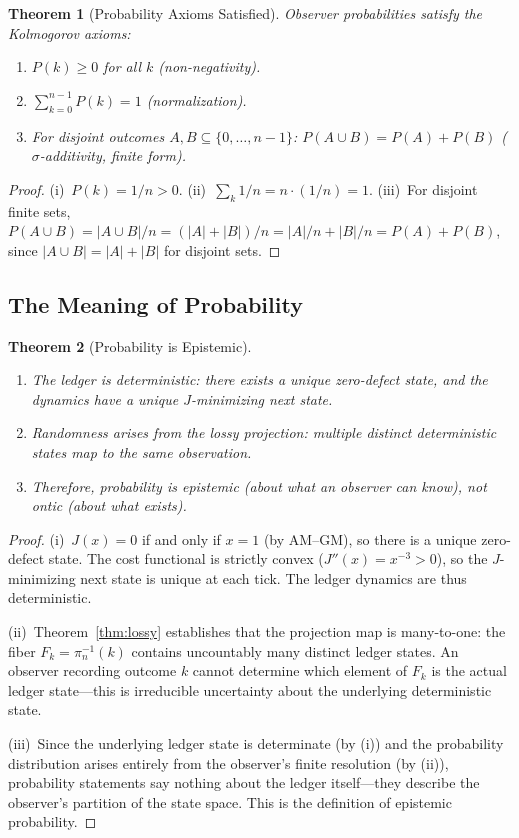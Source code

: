 \documentclass[12pt,a4paper]{article}
\newtheorem{theorem}{Theorem}[section]
\theoremstyle{definition}
\theoremstyle{remark}
\begin{document}
\begin{theorem}[Probability Axioms Satisfied]
\label{thm:kolmogorov}
Observer probabilities satisfy the Kolmogorov axioms:
\begin{enumerate}[label=(\roman*),nosep]
  \item $P(k) \geq 0$ for all $k$ (non-negativity).
  \item $\sum_{k=0}^{n-1} P(k) = 1$ (normalization).
  \item For disjoint outcomes $A, B \subseteq \{0,\ldots,n{-}1\}$:
  $P(A \cup B) = P(A) + P(B)$ ($\sigma$-additivity, finite form).
\end{enumerate}
\end{theorem}

\begin{proof}
(i)~$P(k) = 1/n > 0$.
(ii)~$\sum_{k} 1/n = n \cdot (1/n) = 1$.
(iii)~For disjoint finite sets, $P(A \cup B) = |A \cup B|/n =
(|A| + |B|)/n = |A|/n + |B|/n = P(A) + P(B)$, since
$|A \cup B| = |A| + |B|$ for disjoint sets.
\end{proof}

\subsection{The Meaning of Probability}

\begin{theorem}[Probability is Epistemic]
\label{thm:epistemic}
\begin{enumerate}[label=(\roman*),nosep]
  \item The ledger is deterministic: there exists a unique zero-defect
  state, and the dynamics have a unique $J$-minimizing next state.
  \item Randomness arises from the lossy projection: multiple distinct
  deterministic states map to the same observation.
  \item Therefore, probability is epistemic (about what an observer can
  know), not ontic (about what exists).
\end{enumerate}
\end{theorem}

\begin{proof}
(i)~$J(x) = 0$ if and only if $x = 1$ (by AM--GM), so there is a
unique zero-defect state.  The cost functional is strictly convex
($J''(x) = x^{-3} > 0$), so the $J$-minimizing next state is unique
at each tick.  The ledger dynamics are thus deterministic.

(ii)~Theorem~\ref{thm:lossy} establishes that the projection map is
many-to-one: the fiber $F_k = \pi_n^{-1}(k)$ contains uncountably
many distinct ledger states.  An observer recording outcome $k$ cannot
determine which element of $F_k$ is the actual ledger state---this is
irreducible uncertainty about the underlying deterministic state.

(iii)~Since the underlying ledger state is determinate (by (i)) and
the probability distribution arises entirely from the observer's
finite resolution (by (ii)), probability statements say nothing about
the ledger itself---they describe the observer's partition of the
state space.  This is the definition of epistemic probability.
\end{proof}
\end{document}
